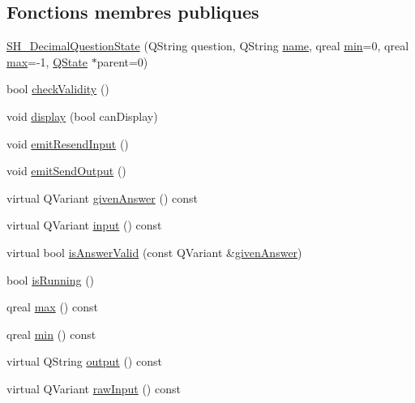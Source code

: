 \subsection*{Fonctions membres publiques}
\begin{DoxyCompactItemize}
\item 
\hyperlink{classSH__DecimalQuestionState_ae327306d90b2a30152f5b64cb75d8a5d}{S\-H\-\_\-\-Decimal\-Question\-State} (Q\-String question, Q\-String \hyperlink{classSH__NamedObject_a9f686c6f2a5bcc08ad03d0cee0151f0f}{name}, qreal \hyperlink{classSH__DecimalQuestionState_ac909214eeb0e370c16718cb698bfec2c}{min}=0, qreal \hyperlink{classSH__DecimalQuestionState_a17bd2b3f5766c5379d7f057d7d4aa178}{max}=-\/1, \hyperlink{classQState}{Q\-State} $\ast$parent=0)
\item 
bool \hyperlink{classSH__QuestionState_a902be003650c33d954d707b2d3ee0bb9}{check\-Validity} ()
\item 
void \hyperlink{classSH__InOutState_a616f88b20478b81b2927a9ddc2b4f521}{display} (bool can\-Display)
\item 
void \hyperlink{classSH__InOutState_ad1695493d39c5194e5b7c6372754ddd7}{emit\-Resend\-Input} ()
\item 
void \hyperlink{classSH__InOutState_a40995f4a8201f21d26b7e78b7e7b652e}{emit\-Send\-Output} ()
\item 
virtual Q\-Variant \hyperlink{classSH__QuestionState_a29cdea8bc55e39e3ed02d24743c30f8c}{given\-Answer} () const 
\item 
virtual Q\-Variant \hyperlink{classSH__InOutState_a8e1b78069343122df7713624a1a5a100}{input} () const 
\item 
virtual bool \hyperlink{classSH__DecimalQuestionState_a99f815a5101340867400f093e89f2210}{is\-Answer\-Valid} (const Q\-Variant \&\hyperlink{classSH__QuestionState_a29cdea8bc55e39e3ed02d24743c30f8c}{given\-Answer})
\item 
bool \hyperlink{classSH__GenericState_a5f731810dad0cacd28828ccbf1539e4e}{is\-Running} ()
\item 
qreal \hyperlink{classSH__DecimalQuestionState_a17bd2b3f5766c5379d7f057d7d4aa178}{max} () const 
\item 
qreal \hyperlink{classSH__DecimalQuestionState_ac909214eeb0e370c16718cb698bfec2c}{min} () const 
\item 
virtual Q\-String \hyperlink{classSH__InOutState_a17ed7eaf5e3ed5af80a4f9fe65d5bfd9}{output} () const 
\item 
virtual Q\-Variant \hyperlink{classSH__InOutState_a4c674a54f41d2e6ef951b22393dcd89f}{raw\-Input} () const 

\end{DoxyCompactItemize}
